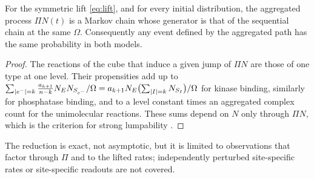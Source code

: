 \begin{proposition}\label{prop:lump}
For the symmetric lift \eqref{eq:lift}, and for every initial distribution, the aggregated
process \(\Pi N(t)\) is a Markov chain whose generator is that of the sequential chain at the
same \(\Omega\). Consequently any event defined by the aggregated path has the same
probability in both models.
\end{proposition}
\begin{proof}
The reactions of the cube that induce a given jump of \(\Pi N\) are those of one type at one
level. Their propensities add up to
\(\sum_{|e^{-}|=k}\frac{a_{k+1}}{n-k}N_EN_{S_{e^{-}}}/\Omega
=a_{k+1}N_E\bigl(\sum_{|I|=k}N_{S_I}\bigr)/\Omega\) for kinase binding, similarly for
phosphatase binding, and to a level constant times an aggregated complex count for the
unimolecular reactions. These sums depend on \(N\) only through \(\Pi N\), which is the
criterion for strong lumpability \cite{KemenySnell1960}.
\end{proof}
The reduction is exact, not asymptotic, but it is limited to observations that factor through
\(\Pi\) and to the lifted rates; independently perturbed site-specific rates or site-specific
readouts are not covered.

